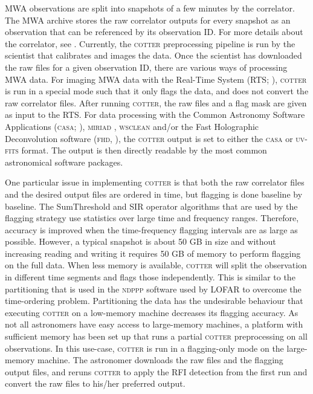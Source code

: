 \documentclass{pasa}
\begin{document}
MWA observations are split into snapshots of a few minutes by the correlator. The MWA archive stores the raw correlator outputs for every snapshot as an observation that can be referenced by its observation ID. For more details about the correlator, see \citet{ord-2014-mwa-fpga-gpu}. Currently, the \textsc{cotter} preprocessing pipeline is run by the scientist that calibrates and images the data. Once the scientist has downloaded the raw files for a given observation ID, there are various ways of processing MWA data. For imaging MWA data with the Real-Time System (RTS; \citealt{rts-mwa-2008}), \textsc{cotter} is run in a special mode such that it only flags the data, and does not convert the raw correlator files. After running \textsc{cotter}, the raw files and a flag mask are given as input to the RTS. For data processing with the Common Astronomy Software Applications (\textsc{casa}; \citealt{casa-2008}), \textsc{miriad} \citep{miriad-sault-1995}, \textsc{wsclean} \citep{offringa-wsclean-2014} and/or the Fast Holographic Deconvolution software (\textsc{fhd}, \citealt{fhd-sullivan-2012}), the \textsc{cotter} output is set to either the \textsc{casa} or \textsc{uv-fits} format. The output is then directly readable by the most common astronomical software packages. 

One particular issue in implementing \textsc{cotter} is that both the raw correlator files and the desired output files are ordered in time, but flagging is done baseline by baseline. The SumThreshold and SIR operator algorithms that are used by the flagging strategy use statistics over large time and frequency ranges. Therefore, accuracy is improved when the time-frequency flagging intervals are as large as possible. However, a typical snapshot is about 50 GB in size and without increasing reading and writing it requires 50 GB of memory to perform flagging on the full data. When less memory is available, \textsc{cotter} will split the observation in different time segments and flags those independently. This is similar to the partitioning that is used in the \textsc{ndppp} software used by LOFAR \citep{lofar-imaging-cookbook} to overcome the time-ordering problem. Partitioning the data has the undesirable behaviour that executing \textsc{cotter} on a low-memory machine decreases its flagging accuracy. As not all astronomers have easy access to large-memory machines, a platform with sufficient memory has been set up that runs a partial \textsc{cotter} preprocessing on all observations. In this use-case, \textsc{cotter} is run in a flagging-only mode on the large-memory machine. The astronomer downloads the raw files and the flagging output files, and reruns \textsc{cotter} to apply the RFI detection from the first run and convert the raw files to his/her preferred output.
\end{document}
